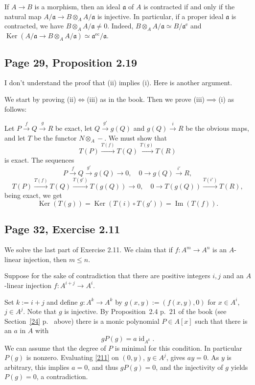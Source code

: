 \documentclass[parskip=half,fontsize=12pt]{scrartcl}%
\newcommand{\oo}{\operatorname}\newcommand{\ooo}{\operatorname*}
\newcommand{\mf}{\mathfrak}
\newcommand{\Ker}{\operatorname{Ker}}\newcommand{\Coker}{\operatorname{Coker}}
\newcommand{\xr}{\xrightarrow}
\begin{document}
If $A\to B$ is a morphism, then an ideal $\mf a$ of $A$ is contracted if and only if the natural map $A/\mf a\to B\otimes_A A/\mf a$ is injective. In particular, if a proper ideal $\mf a$ is contracted, we have $B\otimes_A A/\mf a\ne0$. Indeed, $B\otimes_A A/\mf a\simeq B/\mf a^{\oo e}$ and $\oo{Ker}(A/\mf a\to B\otimes_A A/\mf a)\simeq\mf a^{\oo{ec}}/\mf a$. %

\subsection{Page 29, Proposition 2.19}%

I don't understand the proof that (ii) implies (i). Here is another argument.

We start by proving (ii)$\iff$(iii) as in the book. Then we prove (iii)$\implies$(i) as follows:

Let $P\xr fQ\xr gR$ be exact, let $Q\xr{g'}g(Q)$ and $g(Q)\xr iR$ be the obvious maps, and let $T$ be the functor $N\otimes_A-$. We must show that 
$$
T(P)\xr{T(f)}T(Q)\xr{T(g)}T(R)
$$ 
is exact. The sequences 
$$
P\xr fQ\xr{g'}g(Q)\to0,\quad0\to g(Q)\xr{i'}R,
$$ 
$$
T(P)\xr{T(f)}T(Q)\xr{T(g')}T(g(Q))\to0,\quad0\to T(g(Q))\xr{T(i')}T(R),
$$ 
being exact, we get 
$$
\Ker(T(g))=\Ker(T(i)\circ T(g'))=\oo{Im}(T(f)).
$$

\subsection{Page 32, Exercise 2.11}%

We solve the last part of Exercise 2.11. We claim that if $f:A^m\to A^n$ is an $A$-linear injection, then $m\le n$. 

Suppose for the sake of contradiction that there are positive integers $i,j$ and an $A$-linear injection $f:A^{i+j}\to A^i$. 

Set $k:=i+j$ and define $g:A^k\to A^k$ by $g(x,y):=(f(x,y),0)$ for $x\in A^i$, $j\in A^j$. Note that $g$ is injective. By Proposition~2.4 p.~21 of the book (see Section~\ref{24} p.~\pageref{24} above) there is a monic polynomial $P\in A[x]$ such that there is an $a$ in $A$ with 
\begin{equation}\label{211}
gP(g)=a\oo{id}_{A^k}.
\end{equation} 
We can assume that the degree of $P$ is minimal for this condition. In particular $P(g)$ is nonzero. Evaluating \eqref{211} on $(0,y)$, $y\in A^j$, gives $ay=0$. As $y$ is arbitrary, this implies $a=0$, and thus $gP(g)=0$, and the injectivity of $g$ yields $P(g)=0$, a contradiction.
\end{document}
